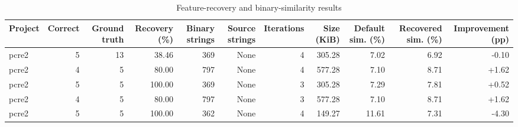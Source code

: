 \begin{table}[htbp]
\centering
\caption{Feature-recovery and binary-similarity results}
\label{tab:feature-recovery-results}
\small
\begin{tabular}{lrrrrrrrrrr}
\toprule
Project & Correct & Ground truth & Recovery (\%) & Binary strings & Source strings & Iterations & Size (KiB) & Default sim. (\%) & Recovered sim. (\%) & Improvement (pp) \\
\midrule
pcre2 & 5 & 13 & 38.46 & 369 & None & 4 & 305.28 & 7.02 & 6.92 & -0.10 \\
pcre2 & 4 & 5 & 80.00 & 797 & None & 4 & 577.28 & 7.10 & 8.71 & +1.62 \\
pcre2 & 5 & 5 & 100.00 & 369 & None & 3 & 305.28 & 7.29 & 7.81 & +0.52 \\
pcre2 & 4 & 5 & 80.00 & 797 & None & 3 & 577.28 & 7.10 & 8.71 & +1.62 \\
pcre2 & 5 & 5 & 100.00 & 362 & None & 4 & 149.27 & 11.61 & 7.31 & -4.30 \\
\bottomrule
\end{tabular}
\end{table}
